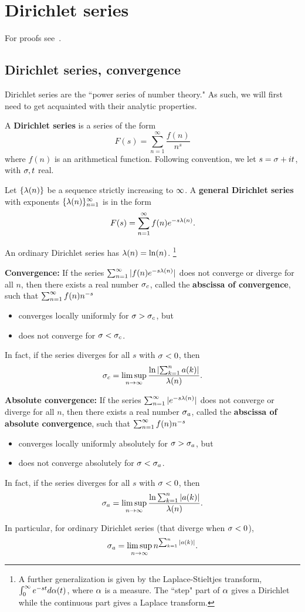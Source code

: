 \chapter{Dirichlet series}
For proofs see~\cite{Ap94}.
\section{Dirichlet series, convergence}
Dirichlet series are the ``power series of number theory." As such, we will first need to get acquainted with their analytic properties.
\begin{df}
A \textbf{Dirichlet series} is a series of the form
\[
F(s)=\sum_{n=1}^{\infty} \frac{f(n)}{n^s}
\]
where $f(n)$ is an arithmetical function. Following convention, we let $s=\sigma+it$, with $\sigma,t$ real.

Let $\{\lambda(n)\}$ be a sequence strictly increasing to $\infty$.  
A \textbf{general Dirichlet series} with exponents $\{\lambda(n)\}_{n=1}^{\infty}$ is in the form
\[
F(s)=\sum_{n=1}^{\infty}f(n)e^{-s\lambda(n)}.
\]
\end{df}
An ordinary Dirichlet series has $\lambda(n)=\ln(n)$. %
\footnote{A further generalization is given by the Laplace-Stieltjes transform, $\int_0^{\infty} e^{-st} d\alpha(t)$, where $\alpha$ is a measure. The ``step" part of $\alpha$ gives a Dirichlet  while the continuous part gives a Laplace transform.}
\begin{thm}
\textbf{Convergence: }
If the series $\sum_{n=1}^{\infty}|f(n)e^{-s\lambda(n)}|$ does not converge or diverge for all $n$, then there exists a real number $\sigma_c$, called the \textbf{abscissa of convergence}, such that $\sum_{n=1}^{\infty} f(n)n^{-s}$
\begin{itemize}
\item converges locally uniformly for $\sigma> \sigma_c$, but
\item does not converge for $\sigma<\sigma_c$.
\end{itemize}
In fact, if the series diverges for all $s$ with $\sigma<0$, then
\[
\sigma_c=\limsup_{n\to \infty} \frac{\ln \left| {\sum_{k=1}^n a(k)} \right|}{\lambda(n)}.
\]

\textbf{Absolute convergence: }
If the series $\sum_{n=1}^{\infty}|e^{-s\lambda(n)}|$ does not converge or diverge for all $n$, then there exists a real number $\sigma_a$, called the \textbf{abscissa of absolute convergence}, such that $\sum_{n=1}^{\infty} f(n)n^{-s}$
\begin{itemize}
\item converges locally uniformly absolutely for $\sigma> \sigma_a$, but
\item does not converge absolutely for $\sigma<\sigma_a$.
\end{itemize}
In fact, if the series diverges for all $s$ with $\sigma<0$, then
\[
\sigma_a=\limsup_{n\to \infty} \frac{\ln \sum_{k=1}^n |a(k)|}{\lambda(n)}.
\]
\end{thm}
In particular, for ordinary Dirichlet series (that diverge when $\sigma<0$),
\[
\sigma_a=\limsup_{n\to \infty} n^{\sum_{k=1}^n |a(k)|}.
\]
